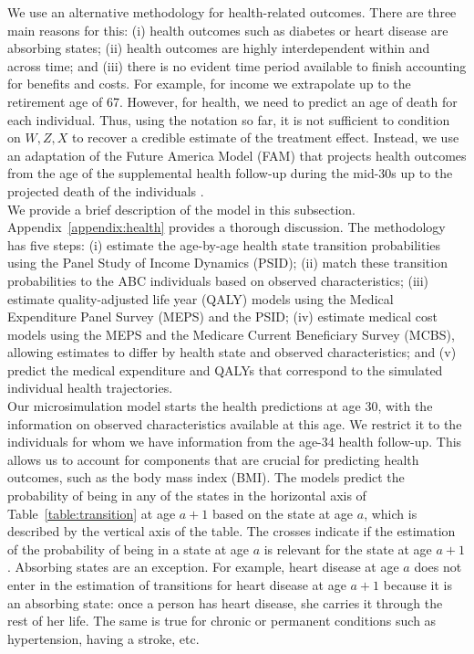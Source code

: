 \noindent We use an alternative methodology for health-related outcomes. There are three main reasons for this: (i) health outcomes such as diabetes or heart disease are absorbing states; (ii) health outcomes are highly interdependent within and across time; and (iii) there is no evident time period available to finish accounting for benefits and costs. For example, for income we extrapolate up to the retirement age of 67. However, for health, we need to predict an age of death for each individual. Thus, using the notation so far, it is not sufficient to condition on $W, Z, X$ to recover a credible estimate of the treatment effect. Instead, we use an adaptation of the Future America Model (FAM) that projects health outcomes from the age of the supplemental health follow-up during the mid-30s up to the projected death of the individuals \citep{Goldman_etal_2015_Future-Elderly-Model-Report}. \\

\noindent We provide a brief description of the model in this subsection. Appendix~\ref{appendix:health} provides a thorough discussion. The methodology has five steps: (i) estimate the age-by-age health state transition probabilities using the Panel Study of Income Dynamics (PSID); (ii) match these transition probabilities to the ABC individuals based on observed characteristics; (iii) estimate quality-adjusted life year (QALY) models using the Medical Expenditure Panel Survey (MEPS) and the PSID; (iv) estimate medical cost models using the MEPS and the Medicare Current Beneficiary Survey (MCBS), allowing estimates to differ by health state and observed characteristics; and (v) predict the medical expenditure and QALYs that correspond to the simulated individual health trajectories. \\

\noindent Our microsimulation model starts the health predictions at age 30, with the information on observed characteristics available at this age. We restrict it to the individuals for whom we have information from the age-34 health follow-up. This allows us to account for components that are crucial for predicting health outcomes, such as the body mass index (BMI). The models predict the probability of being in any of the states in the horizontal axis of Table~\ref{table:transition} at age $a+1$ based on the state at age $a$, which is described by the vertical axis of the table. The crosses indicate if the estimation of the probability of being in a state at age $a$ is relevant for the state at age $a + 1$. Absorbing states are an exception. For example, heart disease at age $a$ does not enter in the estimation of transitions for heart disease at age $a+1$ because it is an absorbing state: once a person has heart disease, she carries it through the rest of her life. The same is true for chronic or permanent conditions such as hypertension, having a stroke, etc.

